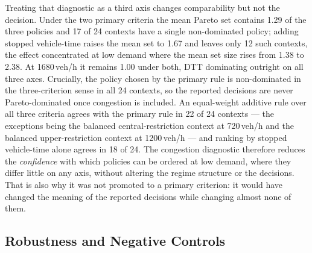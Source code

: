 \documentclass[runningheads]{llncs}
\begin{document}
Treating that diagnostic as a third axis changes comparability but not the decision. Under
the two primary criteria the mean Pareto set contains 1.29 of the three policies and 17 of
24 contexts have a single non-dominated policy; adding stopped vehicle-time raises the
mean set to 1.67 and leaves only 12 such contexts, the effect concentrated at low demand
where the mean set size rises from 1.38 to 2.38. At 1680\,veh/h it remains 1.00 under
both, DTT dominating outright on all three axes. Crucially, the policy chosen by the
primary rule is non-dominated in the three-criterion sense in all 24 contexts, so the
reported decisions are never Pareto-dominated once congestion is included. An equal-weight
additive rule over all three criteria agrees with the primary rule in 22 of 24 contexts
--- the exceptions being the balanced central-restriction context at 720\,veh/h and the
balanced upper-restriction context at 1200\,veh/h --- and ranking by stopped vehicle-time
alone agrees in 18 of 24. The congestion diagnostic therefore reduces the \emph{confidence}
with which policies can be ordered at low demand, where they differ little on any axis,
without altering the regime structure or the decisions. That is also why it was not
promoted to a primary criterion: it would have changed the meaning of the reported
decisions while changing almost none of them.

\subsection{Robustness and Negative Controls}
\label{sec:robust}
\end{document}
